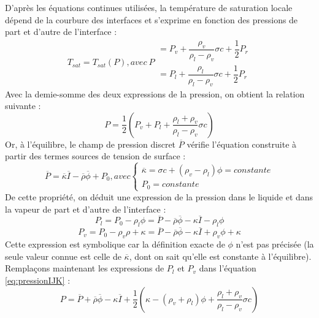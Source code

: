 D’après les \'equations continues utilis\'ees, la temp\'erature de saturation locale d\'epend de la courbure des interfaces et s’exprime en fonction des pressions de part et d’autre de l’interface :
\begin{equation}
T_{sat} = T_{sat}(P), avec \:P \begin{array}{rcl} = P_{v} + \dfrac{\rho_{v}}{\rho_{l} - \rho_{v}} \sigma c + \dfrac{1}{2} P_{r}\\
 = P_{l} + \dfrac{\rho_{l}}{\rho_{l} - \rho_{v}} \sigma c + \dfrac{1}{2} P_{r}\end{array}
\end{equation}
Avec la demie-somme des deux expressions de la pression, on obtient la relation
suivante :
\begin{equation}
P = \dfrac{1}{2} \left( P_{v} + P_{l} + \dfrac{\rho_{l} + \rho_{v}}{\rho_{l} - \rho_{v}} \sigma c\right) \label{eq:pressionIJK}
\end{equation}
Or, à l’\'equilibre, le champ de pression discret $\overline{P}$ v\'erifie l’\'equation construite \`a partir des termes sources de tension de surface :
\begin{equation}
\overline{P} = \overline{\kappa} \overline{I} - \overline{\rho} \overline{\phi} + P_{0}, avec \left\{ \begin{array}{rcl}
\overline{\kappa} = \sigma c + (\rho_{v} - \rho_{l})\phi = constante\\
P_{0} = constante
\end{array}\right.
\end{equation}
De cette propri\'et\'e, on d\'eduit une expression de la pression dans le liquide et dans la vapeur de part et d’autre de l’interface :
\begin{equation}
P_{l} = P_{0} - \rho_{l}\phi = \overline{P} - \overline{\rho}\overline{\phi} - \kappa\overline{I} - \rho_{l}\phi
\end{equation}
\begin{equation}
P_{v} = P_{0} - \rho_{v}\rho + \kappa = \overline{P} - \overline{\rho}\overline{\phi} - \kappa\overline{I} + \rho_{v}\phi + \kappa
\end{equation}
Cette expression est symbolique car la d\'efinition exacte de $\phi$ n’est pas pr\'ecis\'ee (la seule valeur connue est celle de $\overline{\kappa}$, dont on sait qu’elle est constante à l’\'equilibre). Remplaçons maintenant les expressions de $P_{l}$ et $P_{v}$ dans l’\'equation \ref{eq:pressionIJK} :
\begin{equation}
P = \overline{P} + \overline{\rho}\overline{\phi} - \kappa\overline{I} + \dfrac{1}{2} \left( \kappa - (\rho_{v} + \rho_{l})\phi + \dfrac{\rho_{l}+\rho_{v}}{\rho_{l}-\rho_{v}} \sigma c\right) 
\end{equation}
